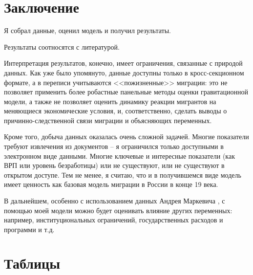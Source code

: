 \documentclass[a4paper,12pt]{article}
\let\oldsection\section
\renewcommand\section{\clearpage\oldsection}
\begin{document}
%

\afterpage{%
	
}\par


\clearpage
\section{Заключение}



Я собрал данные, оценил модель и получил результаты. %

Результаты соотносятся с литературой.

Интерпретация результатов, конечно, имеет ограничения, связанные с природой данных. Как уже было упомянуто, данные доступны только в кросс-секционном формате, а в переписи учитываются <<пожизненные>> миграции: это не позволяет применить более робастные панельные методы оценки гравитационной модели, а также не позволяет оценить динамику реакции мигрантов на меняющиеся экономические условия, и, соответственно, сделать выводы о причинно-следственной связи миграции и объясняющих переменных.

Кроме того, добыча данных оказалась очень сложной задачей. Многие показатели требуют извлечения из документов -- я ограничился только доступными в электронном виде данными. Многие ключевые и интересные показатели (как ВРП или уровень безработицы) или не существуют, или не существуют в открытом доступе. Тем не менее, я считаю, что и в получившемся виде модель имеет ценность как базовая модель миграции в России в конце 19 века. 

В дальнейшем, особенно с использованием данных Андрея Маркевича \citep{markevich_regional_2019}, с помощью моей модели можно будет оценивать влияние других переменных: например, институциональных ограничений, государственных расходов и программи и т.д.




\clearpage\printbibliography


\clearpage\appendix


\section{Таблицы}
\end{document}
